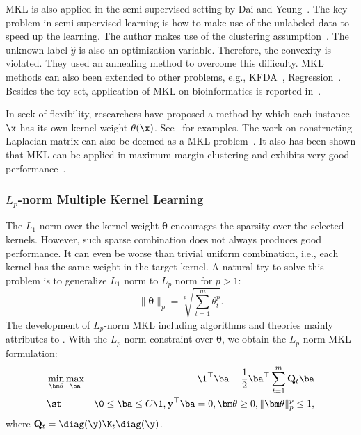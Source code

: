 MKL is also applied in the semi-supervised setting by Dai and Yeung~\cite{icml/DaiY07}. The key problem in semi-supervised learning is how to make use of the unlabeled data to speed up the learning. The author makes use of the clustering assumption~\cite{icml/DaiY07}. The unknown label $\hat{y}$ is also an optimization variable. Therefore, the convexity is violated. They used an annealing method to overcome this difficulty. MKL methods can also been extended to other problems, e.g., KFDA~\cite{icml/FungDBR04,icml/KimMB06}, Regression~\cite{nips/SonnenburgRS05}. Besides the toy set, application of MKL on bioinformatics is reported in~\cite{bioinformatics/LanckrietBCJN04,wabi/OngZ08}.


In seek of flexibility, researchers have proposed a method by which each instance $\x$ has its own kernel weight $\theta(\x)$. See~\cite{icml/LewisJN06, icml/GonenA08} for examples. The work on constructing Laplacian matrix can also be deemed as a MKL problem~\cite{nips/ArgyriouHP05}. It also has been shown that MKL can be applied in maximum margin clustering and exhibits very good performance~\cite{aistats/LiTKZ09}.

\subsubsection{$L_p$-norm Multiple Kernel Learning}

The $L_1$ norm over the kernel weight $\bm\theta$ encourages the sparsity over the selected kernels. However, such sparse combination does not always produces good performance. It can even be worse than trivial uniform combination\cite{icml/Cortes09}, i.e., each kernel has the same weight in the target kernel. A natural try to solve this problem is to generalize $L_1$ norm to $L_p$ norm for $p > 1$:
\[
\| \bm\theta \|_p = \sqrt[p]{\sum_{t=1}^{m}\theta_t^p}.
\]
The development of $L_p$-norm MKL including algorithms and theories mainly attributes to \cite{nips/KloftBSLMZ09,ecml/KloftRB10,jmlr/KloftBSZ11}. With the $L_p$-norm constraint over $\bm\theta$, we obtain the $L_p$-norm MKL formulation:
\begin{eqnarray}
&\min_{\bm\theta}\max_{\ba}& \1^\top\ba - \frac{1}{2} \ba^\top \sum_{t=1}^{m}\mathbf Q_t\ba \nonumber\\
&\st& \0\leq \ba \leq C\1, \mathbf y^\top\ba=0,\bm\theta \geq 0,\| \bm\theta \|_p^p \leq 1,\nonumber
\end{eqnarray}
where $\mathbf Q_t = \diag(\y)\K_t\diag(\y)$.

